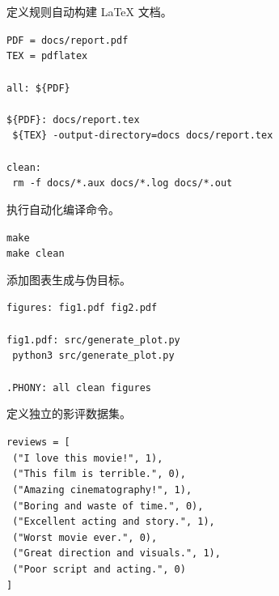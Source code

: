 \documentclass[a4paper, 12pt]{article}
\begin{document}

\begin{tcolorbox}[instancestyle, title=实例10：编写 Makefile 自动化编译]
定义规则自动构建 LaTeX 文档。

\texttt{PDF = docs/report.pdf} \\
\texttt{TEX = pdflatex} \\
\texttt{} \\
\texttt{all: \$\{PDF\}} \\
\texttt{} \\
\texttt{\$\{PDF\}: docs/report.tex} \\
\texttt{	\$\{TEX\} -output-directory=docs docs/report.tex} \\
\texttt{} \\
\texttt{clean:} \\
\texttt{	rm -f docs/*.aux docs/*.log docs/*.out}
\end{tcolorbox}

\begin{tcolorbox}[instancestyle, title=实例11：运行 make 构建文档]
执行自动化编译命令。

\texttt{make} \\
\texttt{make clean}
\end{tcolorbox}

\begin{tcolorbox}[instancestyle, title=实例12：扩展 Makefile 多目标支持]
添加图表生成与伪目标。

\texttt{figures: fig1.pdf fig2.pdf} \\
\texttt{} \\
\texttt{fig1.pdf: src/generate\_plot.py} \\
\texttt{	python3 src/generate\_plot.py} \\
\texttt{} \\
\texttt{.PHONY: all clean figures}
\end{tcolorbox}


\begin{tcolorbox}[instancestyle, title=实例13：准备训练数据（data.py）]
定义独立的影评数据集。

\texttt{reviews = [} \\
\texttt{    ("I love this movie!", 1),} \\
\texttt{    ("This film is terrible.", 0),} \\
\texttt{    ("Amazing cinematography!", 1),} \\
\texttt{    ("Boring and waste of time.", 0),} \\
\texttt{    ("Excellent acting and story.", 1),} \\
\texttt{    ("Worst movie ever.", 0),} \\
\texttt{    ("Great direction and visuals.", 1),} \\
\texttt{    ("Poor script and acting.", 0)} \\
\texttt{]}
\end{tcolorbox}
\end{document}
